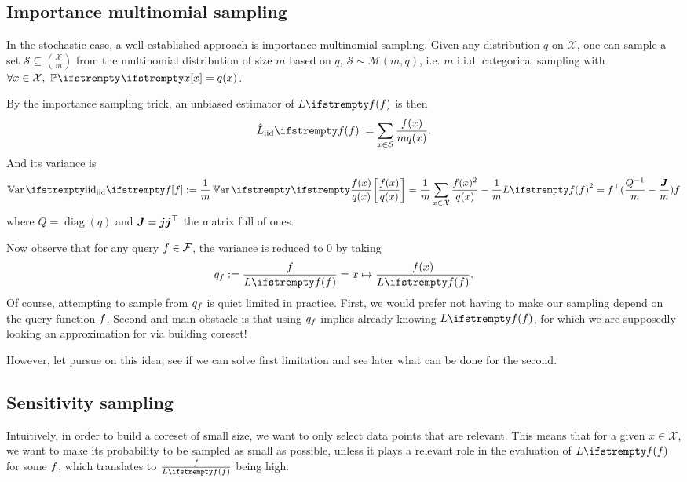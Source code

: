 \subsection{Importance multinomial sampling}

In the stochastic case, a well-established approach is importance multinomial sampling. Given any distribution $q$ on $\mathcal{X}$, one can sample a set $\mathcal{S} \subseteq \binom{\mathcal{X}}{m}$ from the multinomial distribution of size $m$ based on $q$, $\mathcal S \sim \mathcal M(m, q)$, i.e. $m$ i.i.d. categorical sampling with $\forall x \in \mathcal{X},\ \PP{}{x} = q(x)$.

By the importance sampling trick, an unbiased estimator of $\loss{\query}$ is then
\begin{equation*}
	\estloss{\textrm{iid}}{\query} := \sum_{x\in \mathcal S} \frac{\query(x)}{m q(x)}.
\end{equation*}
And its variance is
\begin{equation}
	\Var{\textrm{iid}}{\query} :=\frac{1}{m} \Var{}{\frac {\query(x)} {q(x)}}
	=\frac{1}{m} \sum_{x \in \mathcal{X}} \frac{\query(x)^{2}}{q(x)} -\frac{1}{m} \loss{\query}^{2} = \query\T(\frac{Q^{-1}} m - \frac{\moones} m)\query
\end{equation}
where $Q = \operatorname{diag}(q)$ and $\boldsymbol{J} = \boldsymbol{j} \boldsymbol{j} ^\top$ the matrix full of ones. 


Now observe that for any query $f \in \mathcal{F}$, the variance is reduced to 0 by taking
\begin{equation*}
    q_{\query} :=\frac{ \query}{\loss{\query}} = x \mapsto \frac{ \query(x)}{\loss{\query}}.
\end{equation*}
Of course, attempting to sample from $q_f$ is quiet limited in practice. First, we would prefer not having to make our sampling depend on the query function $f$. Second and main obstacle is that using $q_f$ implies already knowing $\loss{\query}$, for which we are supposedly looking an approximation for via building coreset!

However, let pursue on this idea, see if we can solve first limitation and see later what can be done for the second.

\subsection{Sensitivity sampling}



Intuitively, in order to build a coreset of small size, we want to only select data points that are relevant. This means that for a given $x \in \mathcal{X}$, we want to make its probability to be sampled as small as possible, unless it plays a relevant role in the evaluation of $\loss{\query}$ for some $f$, which translates to $\frac{\query}{\loss{\query}}$ being high.

